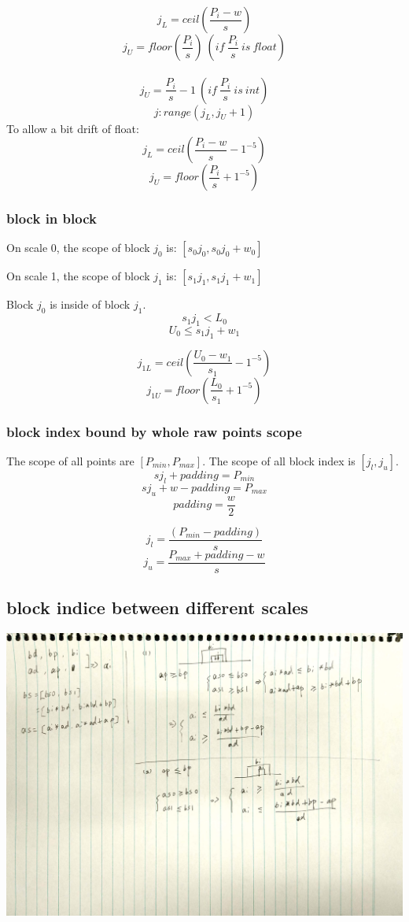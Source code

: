 \documentclass[,table,dvipsnames]{article}
\begin{document}
$$ j_L = ceil(\frac{P_i-w}{s}) $$
$$ j_U =  floor( \frac{P_i}{s})\ ( if\ \frac{P_i}{s}\ is\ float )$$\\
$$ j_U =  \frac{P_i}{s}-1\ ( if\ \frac{P_i}{s}\ is\ int )$$
$$ j:range(j_L, j_U+1) $$
To allow a bit drift of float:
$$ j_L = ceil(\frac{P_i-w}{s} - 1^{-5}) $$
$$ j_U =  floor( \frac{P_i}{s} + 1^{-5}) $$


\subsubsection{block in block}
On scale 0, the scope of block $j_0$ is: $[s_0j_0   ,s_0j_0+w_0]$ \par
On scale 1, the scope of block $j_1$ is: $[s_1j_1 ,s_1j_1+w_1]$ \par
Block $j_0$ is inside of block $j_1$.
$$ s_1j_1   <   L_0$$
$$ U_0  \leq  s_1j_1+w_1 $$

$$j_{1L}= ceil(\frac{U_0- w_1 }{s_1}-1^{-5})$$
$$j_{1U} = floor(\frac{L_0 }{s_1}+1^{-5})$$

\subsubsection{block index bound by whole raw points scope}
The scope of all points are $[P_{min}, P_{max}]$. The scope of all block index is $[j_l, j_u]$.
$$ sj_l+ padding = P_{min}$$
$$ sj_u+w-padding = P_{max} $$
$$ padding = \frac{w}{2}$$

$$ j_l = \frac{(P_{min}-padding)}{s} $$
$$ j_u = \frac{P_{max}+padding-w}{s} $$

\subsection{block indice between different scales}
\includegraphics[width=0.9\textheight]{images_theory/bxmap.png}
\end{document}
